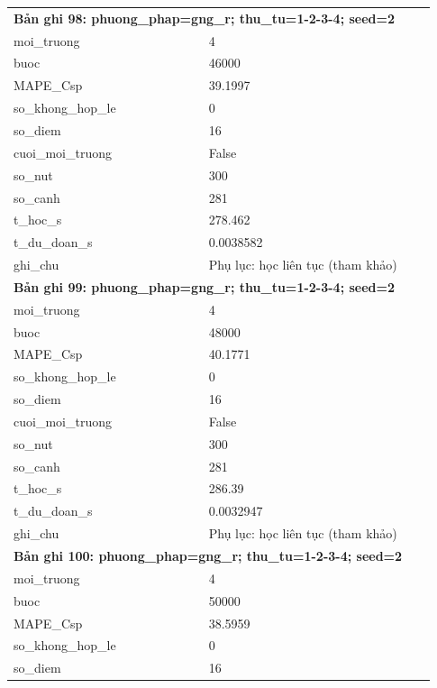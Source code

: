 \begin{longtable}{p{0.43\linewidth}p{0.50\linewidth}}
\midrule
\multicolumn{2}{p{0.95\linewidth}}{\textbf{Bản ghi 98: phuong\_phap=gng\_r; thu\_tu=1-2-3-4; seed=2}} \\
moi\_\allowbreak truong & 4 \\
buoc & 46000 \\
MAPE\_\allowbreak Csp & 39.1997 \\
so\_\allowbreak khong\_\allowbreak hop\_\allowbreak le & 0 \\
so\_\allowbreak diem & 16 \\
cuoi\_\allowbreak moi\_\allowbreak truong & False \\
so\_\allowbreak nut & 300 \\
so\_\allowbreak canh & 281 \\
t\_\allowbreak hoc\_\allowbreak s & 278.462 \\
t\_\allowbreak du\_\allowbreak doan\_\allowbreak s & 0.0038582 \\
ghi\_\allowbreak chu & Phụ lục: học liên tục (tham khảo) \\
\midrule
\multicolumn{2}{p{0.95\linewidth}}{\textbf{Bản ghi 99: phuong\_phap=gng\_r; thu\_tu=1-2-3-4; seed=2}} \\
moi\_\allowbreak truong & 4 \\
buoc & 48000 \\
MAPE\_\allowbreak Csp & 40.1771 \\
so\_\allowbreak khong\_\allowbreak hop\_\allowbreak le & 0 \\
so\_\allowbreak diem & 16 \\
cuoi\_\allowbreak moi\_\allowbreak truong & False \\
so\_\allowbreak nut & 300 \\
so\_\allowbreak canh & 281 \\
t\_\allowbreak hoc\_\allowbreak s & 286.39 \\
t\_\allowbreak du\_\allowbreak doan\_\allowbreak s & 0.0032947 \\
ghi\_\allowbreak chu & Phụ lục: học liên tục (tham khảo) \\
\midrule
\multicolumn{2}{p{0.95\linewidth}}{\textbf{Bản ghi 100: phuong\_phap=gng\_r; thu\_tu=1-2-3-4; seed=2}} \\
moi\_\allowbreak truong & 4 \\
buoc & 50000 \\
MAPE\_\allowbreak Csp & 38.5959 \\
so\_\allowbreak khong\_\allowbreak hop\_\allowbreak le & 0 \\
so\_\allowbreak diem & 16 \\

\end{longtable}
